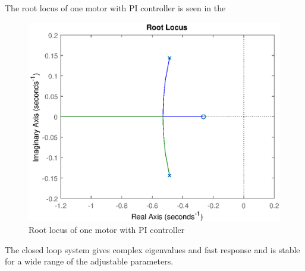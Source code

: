 % 
The root locus of one motor with PI controller is seen in the 
%
\begin{figure}[H]
	\centering
	\includegraphics[width=0.7\linewidth]{figures/pid_rootlocus}
	\caption{Root locus of one motor with PI controller}
	\label{fig:rlocus33}
\end{figure}
%
The closed loop system gives complex eigenvalues and fast response and is stable for a wide range of the adjustable parameters. 
%

%
